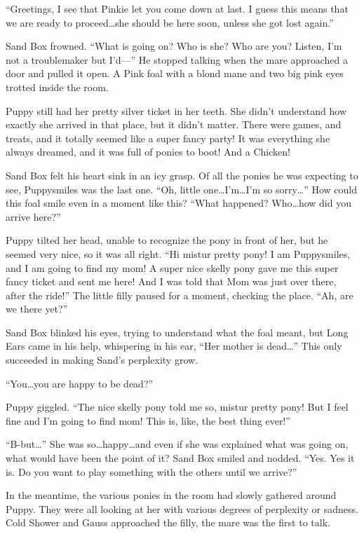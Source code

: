 ``Greetings, I see that Pinkie let you come down at last. I guess this means that we are ready to proceed\dots she should be here soon, unless she got lost again.''

Sand Box frowned. ``What is going on? Who is she? Who are you? Listen, I'm not a troublemaker but I'd---'' He stopped talking when the mare approached a door and pulled it open. A Pink foal with a blond mane and two big pink eyes trotted inside the room.

Puppy still had her pretty silver ticket in her teeth. She didn't understand how exactly she arrived in that place, but it didn't matter. There were games, and treats, and it totally seemed like a super fancy party! It was everything she always dreamed, and it was full of ponies to boot! And a Chicken!

Sand Box felt his heart sink in an icy grasp. Of all the ponies he was expecting to see, Puppysmiles was the last one. ``Oh, little one\dots I'm\dots I'm so sorry\dots'' How could this foal smile even in a moment like this? ``What happened? Who\dots how did you arrive here?''

Puppy tilted her head, unable to recognize the pony in front of her, but he seemed very nice, so it was all right. ``Hi mistur pretty pony! I am Puppysmiles, and I am going to find my mom! A super nice skelly pony gave me this super fancy ticket and sent me here! And I was told that Mom was just over there, after the ride!'' The little filly paused for a moment, checking the place. ``Ah, are we there yet?''

Sand Box blinked his eyes, trying to understand what the foal meant, but Long Ears came in his help, whispering in his ear, ``Her mother is dead\dots'' This only succeeded in making Sand's perplexity grow.

``You\dots you are happy to be dead?''

Puppy giggled. ``The nice skelly pony told me so, mistur pretty pony! But I feel fine and I'm going to find mom! This is, like, the best thing ever!''

``B-but\dots'' She was so\dots happy\dots and even if she was explained what was going on, what would have been the point of it? Sand Box smiled and nodded. ``Yes. Yes it is. Do you want to play something with the others until we arrive?''

In the meantime, the various ponies in the room had slowly gathered around Puppy. They were all looking at her with various degrees of perplexity or sadness. Cold Shower and Gauss approached the filly, the mare was the first to talk.

